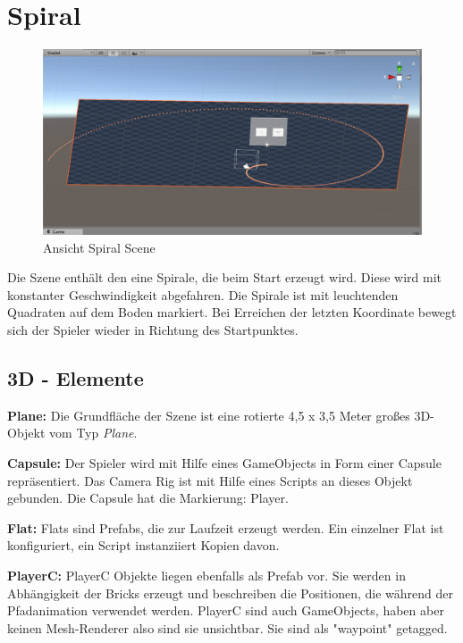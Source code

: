 \section{Spiral}
\label{Spirale}

\begin{figure}[h!]
	\includegraphics[scale=0.5]{bilder/spiralScene.png}
	\caption{Ansicht Spiral Scene}
\end{figure}


Die Szene enthält den eine Spirale, die beim Start erzeugt wird. Diese wird mit konstanter Geschwindigkeit abgefahren. Die Spirale ist mit leuchtenden Quadraten auf dem Boden markiert. Bei Erreichen der letzten Koordinate bewegt sich der Spieler wieder in Richtung des Startpunktes. 

\subsection{3D - Elemente}

\textbf{Plane: } Die Grundfläche der Szene ist eine rotierte 4,5 x 3,5 Meter großes 3D-Objekt vom Typ \emph{Plane}.

\textbf{Capsule: } Der Spieler wird mit Hilfe eines GameObjects in Form einer Capsule repräsentiert. Das Camera Rig ist mit Hilfe eines Scripts an dieses Objekt gebunden. Die Capsule hat die Markierung: Player.

\textbf{Flat: } Flats sind Prefabs, die zur Laufzeit erzeugt werden. Ein einzelner Flat ist konfiguriert, ein Script instanziiert Kopien davon.

\textbf{PlayerC: } PlayerC Objekte liegen ebenfalls als Prefab vor. Sie werden in Abhängigkeit der Bricks erzeugt und beschreiben die Positionen, die während der Pfadanimation verwendet werden. PlayerC sind auch GameObjects, haben aber keinen Mesh-Renderer also sind sie unsichtbar. Sie sind als "waypoint" getagged.


